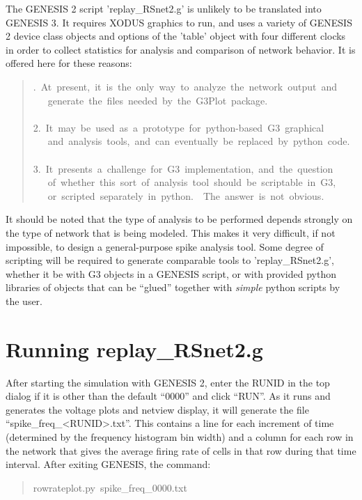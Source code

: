 \documentclass[10pt,a4paper,english]{article}
\begin{document}
The GENESIS 2 script 'replay{\_}RSnet2.g' is unlikely to be translated into
GENESIS 3.  It requires XODUS graphics to run, and uses a variety of
GENESIS 2 device class objects and options of the 'table' object with four
different clocks in order to collect statistics for analysis and comparison
of network behavior.  It is offered here for these reasons:
\begin{quote}{\ttfamily \raggedright {}.~At~present,~it~is~the~only~way~to~analyze~the~network~output~and~\\
~~~generate~the~files~needed~by~the~G3Plot~package.~\\
~\\
2.~It~may~be~used~as~a~prototype~for~python-based~G3~graphical~\\
~~~and~analysis~tools,~and~can~eventually~be~replaced~by~python~code.~\\
~\\
3.~It~presents~a~challenge~for~G3~implementation,~and~the~question~\\
~~~of~whether~this~sort~of~analysis~tool~should~be~scriptable~in~G3,~\\
~~~or~scripted~separately~in~python.~~The~answer~is~not~obvious.
}\end{quote}

It should be noted that the type of analysis to be performed depends
strongly on the type of network that is being modeled.  This makes it
very difficult, if not impossible, to design a general-purpose spike
analysis tool.  Some degree of scripting will be required to generate
comparable tools to 'replay{\_}RSnet2.g', whether it be with G3 objects
in a GENESIS script, or with provided python libraries of objects
that can be ``glued'' together with \emph{simple} python scripts by the user.



\hypertarget{running-replay-rsnet2-g}{}
\section*{Running replay{\_}RSnet2.g}
\label{running-replay-rsnet2-g}

After starting the simulation with GENESIS 2, enter the RUNID in the top
dialog if it is other than the default ``0000'' and click ``RUN''.  As it runs
and generates the voltage plots and netview display, it will generate the
file ``spike{\_}freq{\_}{\textless}RUNID{\textgreater}.txt''.  This contains a line for each increment of
time (determined by the frequency histogram bin width) and a column for
each row in the network that gives the average firing rate of cells in that
row during that time interval.  After exiting GENESIS, the command:
\begin{quote}{\ttfamily \raggedright \noindent
rowrateplot.py~spike{\_}freq{\_}0000.txt
}\end{quote}
\end{document}
